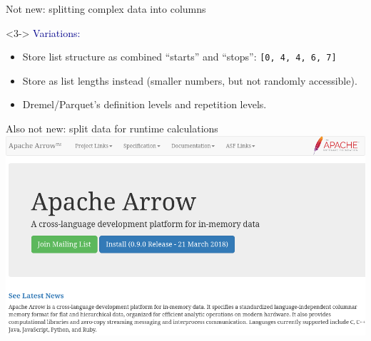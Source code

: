 \documentclass[aspectratio=169]{beamer}
\begin{document}
\begin{frame}{Not new: splitting complex data into columns}
\vspace{0.1 cm}
\begin{uncoverenv}<3->
\textcolor{darkblue}{\large Variations:}
\begin{itemize}
\item Store list structure as combined ``starts'' and ``stops'': {\tt\small [0, 4, 4, 6, 7]}
\item Store as list lengths instead (smaller numbers, but not randomly accessible).
\item Dremel/Parquet's definition levels and repetition levels.
\end{itemize}
\end{uncoverenv}
\end{frame}

\begin{frame}{Also not new: split data for runtime calculations}
\vspace{0.3 cm}
\includegraphics[width=\linewidth]{apache-arrow.png}
\end{frame}
\end{document}
